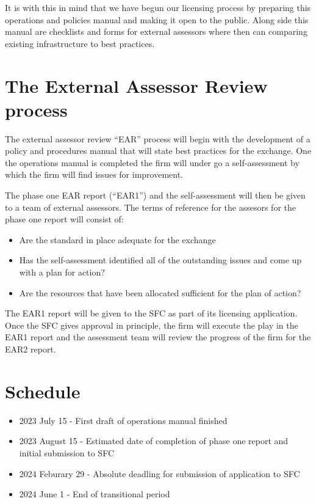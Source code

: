 It is with this in mind that we have begun our licensing process by
preparing this operations and policies manual and making it open to
the public.  Along side this manual are checklists and forms for
external assessors where then can comparing existing infrastructure to
best practices.

\section{The External Assessor Review process}

The external assessor review ``EAR'' process will begin with the
development of a policy and procedures manual that will state best
practices for the exchange.  One the operations manual is completed
the firm will under go a self-assessment by which the firm will find
issues for improvement.

The phase one EAR report (``EAR1'') and the self-assessment will then
be given to a team of external assessors.  The terms of reference for
the assesors for the phase one report will consist of:

\begin{itemize}
\item Are the standard in place adequate for the exchange
  \item Has the self-assessment identified all of the outstanding
    issues and come up with a plan for action?
  \item Are the resources that have been allocated sufficient for the
    plan of action?
\end{itemize}

The EAR1 report will be given to the SFC as part of its licensing
application.  Once the SFC gives approval in principle, the firm will
execute the play in the EAR1 report and the assessment team will
review the progress of the firm for the EAR2 report.

\section{Schedule}
\begin{itemize}
\item 2023 July 15 - First draft of operations manual finished
  \item 2023 August 15 - Estimated date of completion of phase one
    report and initial submission to SFC
    \item 2024 Feburary 29 - Absolute deadling for submission of
      application to SFC
    \item 2024 June 1 - End of transitional period
\end{itemize}


